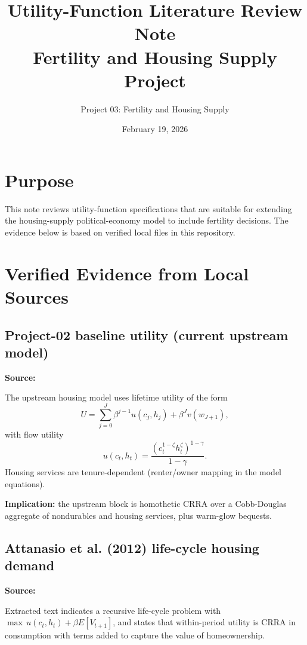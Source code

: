 \documentclass[11pt]{article}
\title{Utility-Function Literature Review Note \\ Fertility and Housing Supply Project}
\author{Project 03: Fertility and Housing Supply}
\date{February 19, 2026}
\begin{document}
\maketitle

\section*{Purpose}
This note reviews utility-function specifications that are suitable for extending the housing-supply political-economy model to include fertility decisions. The evidence below is based on verified local files in this repository.

\section{Verified Evidence from Local Sources}

\subsection{Project-02 baseline utility (current upstream model)}
\textbf{Source:} 

The upstream housing model uses lifetime utility of the form
\begin{equation}
U = \sum_{j=0}^{J} \beta^{j-1} u(c_j,h_j) + \beta^J v(w_{J+1}),
\end{equation}
with flow utility
\begin{equation}
u(c_t,h_t)=\frac{\left(c_t^{1-\zeta}h_t^{\zeta}\right)^{1-\gamma}}{1-\gamma}.
\end{equation}
Housing services are tenure-dependent (renter/owner mapping in the model equations).

\textbf{Implication:} the upstream block is homothetic CRRA over a Cobb-Douglas aggregate of nondurables and housing services, plus warm-glow bequests.

\subsection{Attanasio et al. (2012) life-cycle housing demand}
\textbf{Source:} 

Extracted text indicates a recursive life-cycle problem with
\(\max\, u(c_t,h_t)+\beta E[V_{t+1}]\), and states that within-period utility is CRRA in consumption with terms added to capture the value of homeownership.
\end{document}

